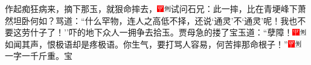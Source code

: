 作起痴狂病来，摘下那玉，就狠命摔去，{\includegraphics[width=3mm]{../Images/00002}\includegraphics[width=3mm]{../Images/00011}\footnotesize \kaishu 试问石兄：此一摔，比在青埂峰下萧然坦卧何如？}骂道：``什么罕物，连人之高低不择，还说`通灵'不`通灵'呢！我也不要这劳什子了！''吓的地下众人一拥争去拾玉。贾母急的搂了宝玉道：``孽障！{\includegraphics[width=3mm]{../Images/00002}\includegraphics[width=3mm]{../Images/00011}\footnotesize \kaishu 如闻其声，恨极语却是疼极语。}你生气，要打骂人容易，何苦摔那命根子！''{\includegraphics[width=3mm]{../Images/00002}\includegraphics[width=3mm]{../Images/00011}\footnotesize \kaishu 一字一千斤重。}宝